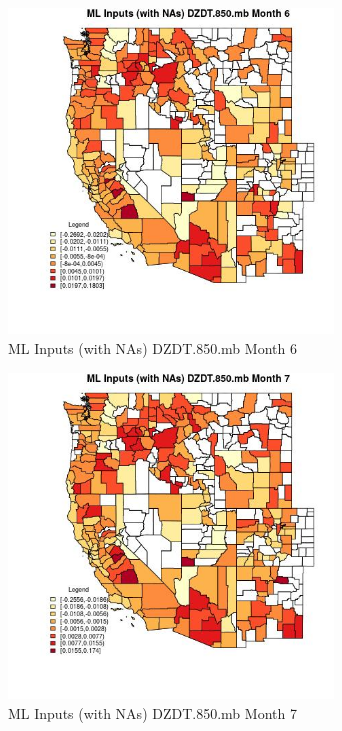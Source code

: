 \begin{figure} 
\centering  
\includegraphics[width=0.77\textwidth]{Code_Outputs/Report_ML_input_PM25_Step4_part_f_de_duplicated_aves_prioritize_24hr_obswNAs_CountyDZDT850mbmedianMonth6.jpg} 
\caption{\label{fig:Report_ML_input_PM25_Step4_part_f_de_duplicated_aves_prioritize_24hr_obswNAsCountyDZDT850mbmedianMonth6}ML Inputs (with NAs) DZDT.850.mb Month 6} 
\end{figure} 
 

\begin{figure} 
\centering  
\includegraphics[width=0.77\textwidth]{Code_Outputs/Report_ML_input_PM25_Step4_part_f_de_duplicated_aves_prioritize_24hr_obswNAs_CountyDZDT850mbmedianMonth7.jpg} 
\caption{\label{fig:Report_ML_input_PM25_Step4_part_f_de_duplicated_aves_prioritize_24hr_obswNAsCountyDZDT850mbmedianMonth7}ML Inputs (with NAs) DZDT.850.mb Month 7} 
\end{figure} 
 

